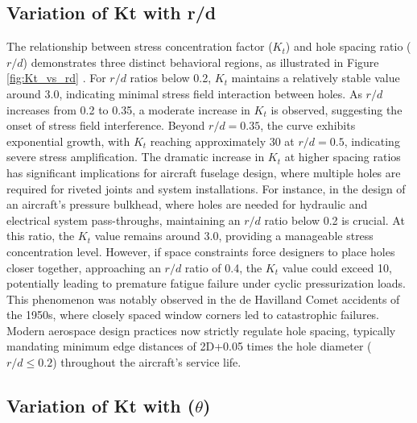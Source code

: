 \documentclass[a4paper,11pt]{article}
\begin{document}
\subsection{Variation of Kt with r/d}
\vspace{-10pt}
The relationship between stress concentration factor ($K_t$) and hole spacing ratio ($r/d$) demonstrates three distinct behavioral regions, as illustrated in Figure \ref{fig:Kt_vs_rd} . For $r/d$ ratios below 0.2, $K_t$ maintains a relatively stable value around 3.0, indicating minimal stress field interaction between holes. As $r/d$ increases from 0.2 to 0.35, a moderate increase in $K_t$ is observed, suggesting the onset of stress field interference. Beyond $r/d = 0.35$, the curve exhibits exponential growth, with $K_t$ reaching approximately 30 at $r/d = 0.5$, indicating severe stress amplification.  The dramatic increase in $K_t$ at higher spacing ratios has significant implications for aircraft fuselage design, where multiple holes are required for riveted joints and system installations. For instance, in the design of an aircraft's pressure bulkhead, where holes are needed for hydraulic and electrical system pass-throughs\cite{cranfield_resource}, maintaining an $r/d$ ratio below 0.2 is crucial. At this ratio, the $K_t$ value remains around 3.0, providing a manageable stress concentration level. However, if space constraints force designers to place holes closer together, approaching an $r/d$ ratio of 0.4, the $K_t$ value could exceed 10, potentially leading to premature fatigue failure under cyclic pressurization loads. This phenomenon was notably observed in the de Havilland Comet accidents \cite{faa_galyv} of the 1950s, where closely spaced window corners led to catastrophic failures. Modern aerospace design practices now strictly regulate hole spacing, typically mandating minimum edge distances \cite{rivet_edge_distance} of 2D+0.05 times the hole diameter ($r/d \leq 0.2$)  throughout the aircraft's service life.

\vspace{-10pt}
\subsection{Variation of Kt with ($\theta$) }
\vspace{-10pt}
\end{document}
